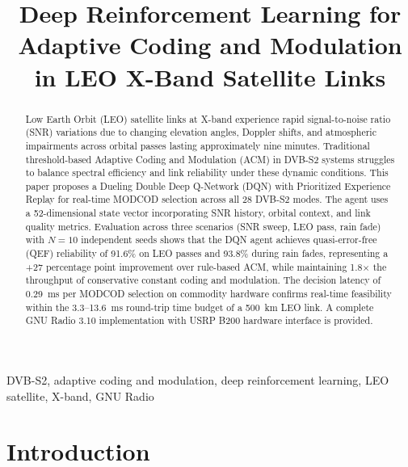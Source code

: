 \documentclass[conference]{IEEEtran}
\begin{document}
\title{Deep Reinforcement Learning for Adaptive Coding and Modulation in LEO X-Band Satellite Links}

\author{
}

\maketitle

\begin{abstract}
Low Earth Orbit (LEO) satellite links at X-band experience rapid signal-to-noise ratio (SNR) variations due to changing elevation angles, Doppler shifts, and atmospheric impairments across orbital passes lasting approximately nine minutes. Traditional threshold-based Adaptive Coding and Modulation (ACM) in DVB-S2 systems struggles to balance spectral efficiency and link reliability under these dynamic conditions. This paper proposes a Dueling Double Deep Q-Network (DQN) with Prioritized Experience Replay for real-time MODCOD selection across all 28 DVB-S2 modes. The agent uses a 52-dimensional state vector incorporating SNR history, orbital context, and link quality metrics. Evaluation across three scenarios (SNR sweep, LEO pass, rain fade) with $N{=}10$ independent seeds shows that the DQN agent achieves quasi-error-free (QEF) reliability of 91.6\% on LEO passes and 93.8\% during rain fades, representing a +27 percentage point improvement over rule-based ACM, while maintaining 1.8$\times$ the throughput of conservative constant coding and modulation. The decision latency of \SI{0.29}{\milli\second} per MODCOD selection on commodity hardware confirms real-time feasibility within the 3.3--\SI{13.6}{\milli\second} round-trip time budget of a \SI{500}{\kilo\metre} LEO link. A complete GNU Radio 3.10 implementation with USRP B200 hardware interface is provided.
\end{abstract}

\begin{IEEEkeywords}
DVB-S2, adaptive coding and modulation, deep reinforcement learning, LEO satellite, X-band, GNU Radio
\end{IEEEkeywords}

\section{Introduction}
\end{document}
